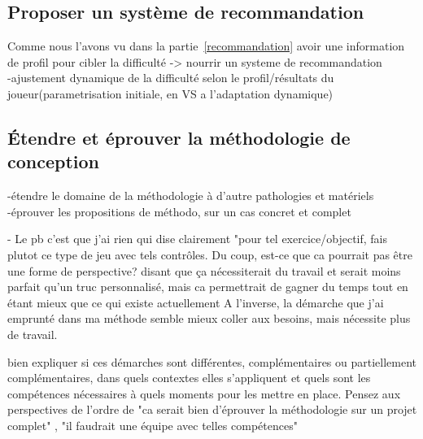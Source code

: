 	\subsection{Proposer un système de recommandation}
Comme nous l'avons vu dans la partie~\ref{recommandation}	avoir une information de profil pour cibler la difficulté -> nourrir un systeme de recommandation\\
	-ajustement dynamique de la difficulté selon le profil/résultats du joueur(parametrisation initiale, en VS a l'adaptation dynamique)
	
	\subsection{Étendre et éprouver la méthodologie de conception}
	-étendre le domaine de la méthodologie à d'autre pathologies et matériels\newline
	-éprouver les propositions de méthodo, sur un cas concret et complet\newline
	
	- Le pb c'est que j'ai rien qui dise clairement "pour tel exercice/objectif, fais plutot ce type de jeu avec tels contrôles. Du coup, est-ce que ca pourrait pas être une forme de perspective? disant que ça nécessiterait du travail et serait moins parfait qu'un truc personnalisé, mais ca permettrait de gagner du temps tout en étant mieux que ce qui existe actuellement
	A l'inverse, la démarche que j'ai emprunté dans ma méthode semble mieux coller aux besoins, mais nécessite plus de travail.
 
 bien expliquer si ces démarches sont différentes, complémentaires ou partiellement complémentaires, dans quels contextes elles s'appliquent et quels sont les compétences nécessaires à quels moments pour les mettre en place.
 Pensez aux perspectives de l'ordre de "ca serait bien d'éprouver la méthodologie sur un projet complet" , "il faudrait une équipe avec telles compétences"